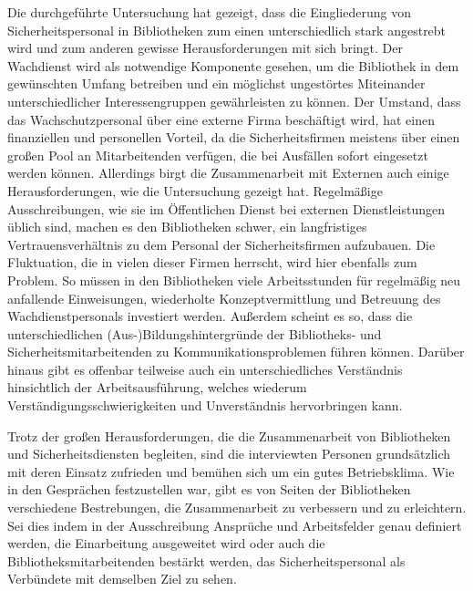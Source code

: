 \documentclass[a4paper,
fontsize=11pt,
oneside,
numbers=noperiodatend,
parskip=half-,
bibliography=totoc,
final
]{scrartcl}
\begin{document}
Die durchgeführte Untersuchung hat gezeigt, dass die Eingliederung von
Sicherheitspersonal in Bibliotheken zum einen unterschiedlich stark
angestrebt wird und zum anderen gewisse Herausforderungen mit sich
bringt. Der Wachdienst wird als notwendige Komponente gesehen, um die
Bibliothek in dem gewünschten Umfang betreiben und ein möglichst
ungestörtes Miteinander unterschiedlicher Interessengruppen
gewährleisten zu können. Der Umstand, dass das Wachschutzpersonal über
eine externe Firma beschäftigt wird, hat einen finanziellen und
personellen Vorteil, da die Sicherheitsfirmen meistens über einen großen
Pool an Mitarbeitenden verfügen, die bei Ausfällen sofort eingesetzt
werden können. Allerdings birgt die Zusammenarbeit mit Externen auch
einige Herausforderungen, wie die Untersuchung gezeigt hat. Regelmäßige
Ausschreibungen, wie sie im Öffentlichen Dienst bei externen
Dienstleistungen üblich sind, machen es den Bibliotheken schwer, ein
langfristiges Vertrauensverhältnis zu dem Personal der Sicherheitsfirmen
aufzubauen. Die Fluktuation, die in vielen dieser Firmen herrscht, wird
hier ebenfalls zum Problem. So müssen in den Bibliotheken viele
Arbeitsstunden für regelmäßig neu anfallende Einweisungen, wiederholte
Konzeptvermittlung und Betreuung des Wachdienstpersonals investiert
werden. Außerdem scheint es so, dass die unterschiedlichen
(Aus-)Bildungshintergründe der Bibliotheks- und
Sicherheitsmitarbeitenden zu Kommunikationsproblemen führen können.
Darüber hinaus gibt es offenbar teilweise auch ein unterschiedliches
Verständnis hinsichtlich der Arbeitsausführung, welches wiederum
Verständigungsschwierigkeiten und Unverständnis hervorbringen kann.

Trotz der großen Herausforderungen, die die Zusammenarbeit von
Bibliotheken und Sicherheitsdiensten begleiten, sind die interviewten
Personen grundsätzlich mit deren Einsatz zufrieden und bemühen sich um
ein gutes Betriebsklima. Wie in den Gesprächen festzustellen war, gibt
es von Seiten der Bibliotheken verschiedene Bestrebungen, die
Zusammenarbeit zu verbessern und zu erleichtern. Sei dies indem in der
Ausschreibung Ansprüche und Arbeitsfelder genau definiert werden, die
Einarbeitung ausgeweitet wird oder auch die Bibliotheksmitarbeitenden
bestärkt werden, das Sicherheitspersonal als Verbündete mit demselben
Ziel zu sehen.
\end{document}
